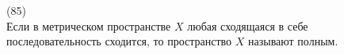 (85)\\
Если в метрическом пространстве $X$ любая сходящаяся в себе последовательность сходится, то пространство $X$ называют полным.